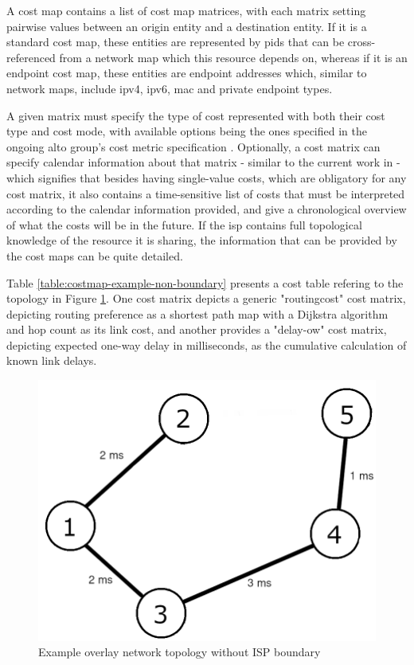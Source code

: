     A cost map contains a list of cost map matrices, with each matrix setting pairwise values between an origin entity and a destination entity.
    If it is a standard cost map, these entities are represented by \glspl{pid} that can be cross-referenced from a network map which this resource depends on, whereas if it is an endpoint cost map, these entities are endpoint addresses which, similar to network maps, include \gls{ipv4}, \gls{ipv6}, \gls{mac} and private endpoint types.

    A given matrix must specify the type of cost represented with both their cost type and cost mode, with available options being the ones specified in the ongoing \gls{alto} group's cost metric specification \cite{alto-cost-metrics}.
    Optionally, a cost matrix can specify calendar information about that matrix - similar to the current work in \cite{alto-calendar-cost-map} - which signifies that besides having single-value costs, which are obligatory for any cost matrix, it also contains a time-sensitive list of costs that must be interpreted according to the calendar information provided, and give a chronological overview of what the costs will be in the future.
    If the \gls{isp} contains full topological knowledge of the resource it is sharing, the information that can be provided by the cost maps can be quite detailed.

    Table \ref{table:costmap-example-non-boundary} presents a cost table refering to the topology in Figure \ref{fig:example-topology}.
    One cost matrix depicts a generic "routingcost" cost matrix, depicting routing preference as a shortest path map with a Dijkstra algorithm and hop count as its link cost, and another provides a "delay-ow" cost matrix, depicting expected one-way delay in milliseconds, as the cumulative calculation of known link delays.

\begin{figure}[H]
        \centering
        \includegraphics[scale=1.00]{img/topology.png}
        \caption{Example overlay network topology without ISP boundary}
        \label{fig:example-topology}
\end{figure}

